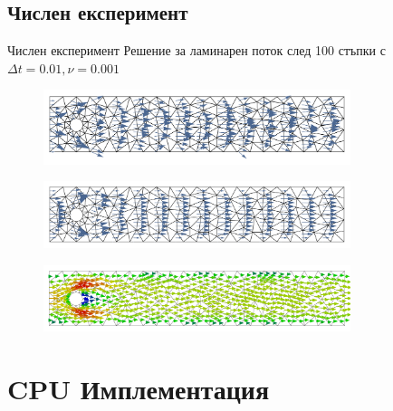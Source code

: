 \documentclass{beamer}
\begin{document}
\subsection{Числен експеримент}
	\begin{frame}{Числен експеримент}
	Решение за ламинарен поток след 100 стъпки с $\Delta t = 0.01, \nu=0.001$
	\begin{figure}[H]
\centering
\includegraphics[width=0.8\textwidth]{../Figures/01_introduction/P1P0_100.pdf}
\end{figure}

\begin{figure}[H]
\centering
\includegraphics[width=0.8\textwidth]{../Figures/01_introduction/P2P1_100.pdf}
\end{figure}

\begin{figure}[H]
\centering
\includegraphics[width=0.8\textwidth]{../Figures/01_introduction/P2P1_adv_diff_100.pdf}
\end{figure}
	\end{frame}
	
\fi

\section{CPU Имплементация}
\end{document}
